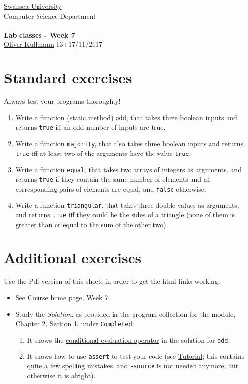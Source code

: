 \documentclass[11pt]{article}
\newcommand{\Java}{\lstset{language=Java,keywordstyle=\bfseries,breaklines,breakindent=30pt}}
\begin{document}
\begin{center}
  \href{http://www.swan.ac.uk/}{Swansea University}\\
  \href{http://www.swan.ac.uk/compsci/}{Computer Science Department}\\[1ex]
  \href{\chp}{\module}\\[1ex]
  \textbf{Lab classes - Week 7}\\
  \href{http://cs.swan.ac.uk/~csoliver}{Oliver Kullmann} 13+17/11/2017
\end{center}


\section{Standard exercises}
\label{sec:stdex}

\Java

Always test your programs thoroughly!

\begin{enumerate}
\item Write a function (static method) \texttt{odd}, that takes three boolean inputs and returns \texttt{true} iff an odd number of inputs are true.
\item Write a function \texttt{majority}, that also takes three boolean inputs and returns \texttt{true} iff at least two of the arguments have the value \texttt{true}.
\item Write a function \texttt{equal}, that takes two arrays of integers as arguments, and returns \texttt{true} if they contain the same number of elements and all corresponding pairs of elements are equal, and \texttt{false} otherwise.
\item Write a function \texttt{triangular}, that takes three double values as arguments, and returns \texttt{true} iff they could be the sides of a triangle (none of them is greater than or equal to the sum of the other two). 
\end{enumerate}


\section{Additional exercises}
\label{sec:addex}

Use the Pdf-version of this sheet, in order to get the html-links working.
\begin{itemize}
\item See \href{\chp#ExercisesWeek07}{Course home page, Week 7}.
\item Study the \emph{Solution}, as provided in the program collection for the module, Chapter 2, Section 1, under \texttt{Completed}:
  \begin{enumerate}
  \item It shows the \href{http://www.cafeaulait.org/course/week2/43.html}{conditional evaluation operator} in the solution for \texttt{odd}.
  \item It shows how to use \texttt{assert} to test your code (see \href{http://sqa.fyicenter.com/FAQ/JUnit/What_Is_Java_assert_Statement_.html}{Tutorial}; this contains quite a few spelling mistakes, and \texttt{-source} is not needed anymore, but otherwise it is alright).
  \end{enumerate}
\end{itemize}
\end{document}
